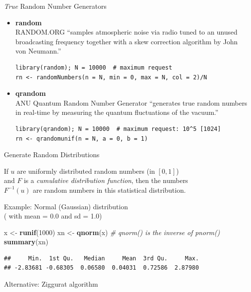 \documentclass[ignorenonframetext,]{beamer}
\newenvironment{Shaded}{\begin{snugshade}}{\end{snugshade}}
\newcommand{\CommentTok}[1]{\textcolor[rgb]{0.56,0.35,0.01}{\textit{#1}}}
\newcommand{\DecValTok}[1]{\textcolor[rgb]{0.00,0.00,0.81}{#1}}
\newcommand{\KeywordTok}[1]{\textcolor[rgb]{0.13,0.29,0.53}{\textbf{#1}}}
\newcommand{\NormalTok}[1]{#1}
\newcommand{\StringTok}[1]{\textcolor[rgb]{0.31,0.60,0.02}{#1}}
\begin{document}
\begin{frame}[fragile]{\emph{True} Random Number Generators}
\protect\hypertarget{true-random-number-generators}{}

\begin{itemize}
\item
  \textbf{random}\\
  RANDOM.ORG ``samples atmospheric noise via radio tuned to an unused
  broadcasting frequency together with a skew correction algorithm by
  John von Neumann.''

\begin{verbatim}
library(random); N = 10000  # maximum request
rn <- randomNumbers(n = N, min = 0, max = N, col = 2)/N
\end{verbatim}
\item
  \textbf{qrandom}\\
  ANU Quantum Random Number Generator ``generates true random numbers in
  real-time by measuring the quantum fluctuations of the vacuum.''

\begin{verbatim}
library(qrandom); N = 10000  # maximum request: 10^5 [1024]
rn <- qrandomunif(n = N, a = 0, b = 1)
\end{verbatim}
\end{itemize}

\end{frame}

\begin{frame}[fragile]{Generate Random Distributions}
\protect\hypertarget{generate-random-distributions}{}

If \(u\) are uniformly distributed random numbers (in \([0, 1]\))\\
and \(F\) is a \emph{cumulative distribution function}, then the
numbers\\
\(F^{-1}(u)\) are random numbers in this statistical distribution.

Example: Normal (Gaussian) distribution\\
( with mean = 0.0 and sd = 1.0)

\begin{Shaded}
\begin{Highlighting}[]
\NormalTok{    x  <-}\StringTok{ }\KeywordTok{runif}\NormalTok{(}\DecValTok{1000}\NormalTok{)}
\NormalTok{    xn <-}\StringTok{ }\KeywordTok{qnorm}\NormalTok{(x)      }\CommentTok{# qnorm() is the inverse of pnorm()}
    \KeywordTok{summary}\NormalTok{(xn)}
\end{Highlighting}
\end{Shaded}

\begin{verbatim}
##     Min.  1st Qu.   Median     Mean  3rd Qu.     Max. 
## -2.83681 -0.68305  0.06580  0.04031  0.72586  2.87980
\end{verbatim}

Alternative: Ziggurat algorithm

\end{frame}
\end{document}
